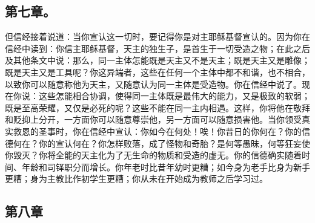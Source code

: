 \subsection{第七章。}

\par

但信经接着说道：当你宣认这一切时，要记得你是对主耶稣基督宣认的。因为你在信经中读到：你信主耶稣基督，天主的独生子，是首生于一切受造之物；在此之后及其他条文中说：那么，同一主体怎能既是天主又不是天主；既是天主又是雕像；既是天主又是工具呢？你这异端者，这些在任何一个主体中都不和谐，也不相合，以致你可以随意称他为天主，又随意认为同一主体是受造物。你在信经中说了。现在你说：这些怎能相合协调，使得同一主体既是最伟大的能力，又是极致的软弱；既是至高荣耀，又仅是必死的呢？这些不能在同一主内相遇。这样，你将他在敬拜和贬抑上分开，一方面你可以随意尊崇他，另一方面可以随意损害他。当你领受真实救恩的圣事时，你在信经中宣认：你如今在何处！唉！你昔日的你何在？你的信德何在？你的宣认何在？你怎样败落，成了怪物和奇胎？是何等愚昧，何等狂妄使你毁灭？你将全能的天主化为了无生命的物质和受造的虚无。你的信德确实随着时间、年龄和司铎职分而增长。你年老时比昔年幼时更糟；如今身为老手比身为新手更糟；身为主教比作初学生更糟；你从未在开始成为教师之后学习过。\par


\subsection{第八章}

\par

